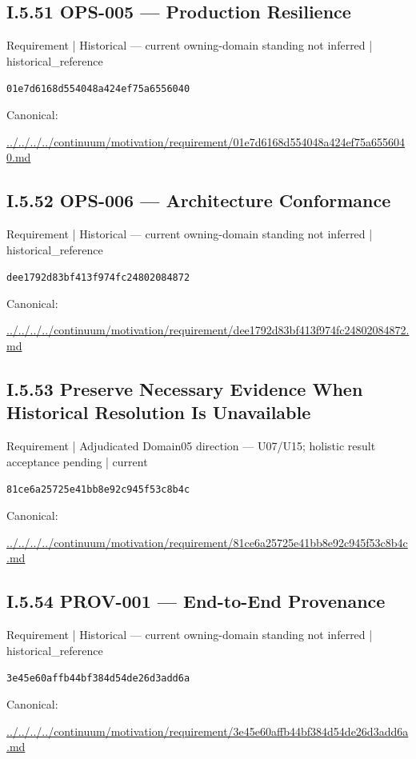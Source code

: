 \documentclass[10pt,a4paper]{article}
\begin{document}
\subsection*{I.5.51 OPS-005 — Production Resilience}
{\small Requirement | Historical — current owning-domain standing not inferred | historical\_reference}\par
\texttt{01e7d6168d554048a424ef75a6556040}\par
Canonical: \par
{\footnotesize\url{../../../../continuum/motivation/requirement/01e7d6168d554048a424ef75a6556040.md}}\par
\subsection*{I.5.52 OPS-006 — Architecture Conformance}
{\small Requirement | Historical — current owning-domain standing not inferred | historical\_reference}\par
\texttt{dee1792d83bf413f974fc24802084872}\par
Canonical: \par
{\footnotesize\url{../../../../continuum/motivation/requirement/dee1792d83bf413f974fc24802084872.md}}\par
\subsection*{I.5.53 Preserve Necessary Evidence When Historical Resolution Is Unavailable}
{\small Requirement | Adjudicated Domain05 direction — U07/U15; holistic result acceptance pending | current}\par
\texttt{81ce6a25725e41bb8e92c945f53c8b4c}\par
Canonical: \par
{\footnotesize\url{../../../../continuum/motivation/requirement/81ce6a25725e41bb8e92c945f53c8b4c.md}}\par
\subsection*{I.5.54 PROV-001 — End-to-End Provenance}
{\small Requirement | Historical — current owning-domain standing not inferred | historical\_reference}\par
\texttt{3e45e60affb44bf384d54de26d3add6a}\par
Canonical: \par
{\footnotesize\url{../../../../continuum/motivation/requirement/3e45e60affb44bf384d54de26d3add6a.md}}\par
\end{document}
